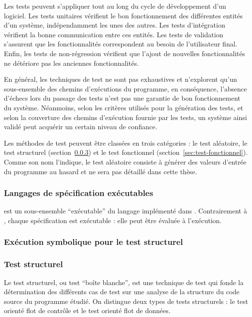 Les tests peuvent s’appliquer tout au long du cycle de développement d’un
logiciel. Les tests unitaires vérifient le bon fonctionnement des différentes
entités d’un système, indépendamment les unes des autres. Les tests
d'intégration vérifient la bonne communication entre ces entités. Les tests de
validation s'assurent que les fonctionnalités correspondent au besoin de
l’utilisateur final. Enfin, les tests de non-régression vérifient que l'ajout de
nouvelles fonctionnalités ne détériore pas les anciennes fonctionnalités.

En général, les techniques de test ne sont pas exhaustives et n'explorent qu'un
sous-ensemble des chemins d'exécutions du programme, en conséquence, l’absence
d’échecs lors du passage des tests n’est pas une garantie de bon fonctionnement
du système. Néanmoins, selon les critères utilisés pour la génération des
tests, et selon la couverture des chemins d'exécution fournie par les tests, un
système ainsi validé peut acquérir un certain niveau de confiance.

Les méthodes de test peuvent être classées en trois catégories : le test
aléatoire, le test structurel (section~\ref{sec:test-structurel}) et le test
fonctionnel (section~\ref{sec:test-fonctionnel}). Comme son nom l'indique, le
test aléatoire consiste à générer des valeurs d'entrée du programme au hasard et
ne sera pas détaillé dans cette thèse.


\subsubsection{Langages de spécification exécutables}
\label{sec:execspeclang}


\eacsl est un sous-ensemble ``exécutable'' du langage \acsl
implémenté dans \framac. Contrairement à \acsl, chaque
spécification \eacsl est exécutable : elle peut être évaluée à
l'exécution.


\subsubsection{Exécution symbolique pour le test structurel}
\label{sec:exec-sym}




\subsubsection{Test structurel}
\label{sec:test-structurel}


Le test structurel, ou test ``boîte blanche'', est une technique de test qui
fonde la détermination des différents cas de test sur une analyse de la
structure du code source du programme étudié. On distingue deux types de tests
structurels : le test orienté flot de contrôle et le test orienté flot de
données.

